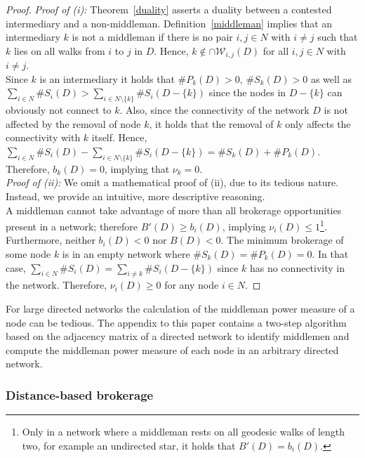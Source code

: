 \begin{proof}
\emph{Proof of (i):}
Theorem~\ref{duality} asserts a duality between a contested intermediary and a non-middleman. Definition~\ref{middleman} implies that an intermediary $k$ is not a middleman if there is no pair $i,j \in N$ with $i \neq j$ such that $k$ lies on all walks from $i$ to $j$ in $D$. Hence, $k \notin \cap \mathcal{W}_{i,j}(D)$ for all $i,j \in N$ with $i \neq j$.
\\
Since $k$ is an intermediary it holds that $\# P_{k}(D) > 0$, $\# S_{k}(D) > 0$ as well as $\sum_{i \in N} \# S_{i}(D) > \sum_{i \in N \setminus \{k\}} \# S_{i}(D - \{k\})$ since the nodes in $D - \{k\}$ can obviously not connect to $k$. Also, since the connectivity of the network $D$ is not affected by the removal of node $k$, it holds that the removal of $k$ only affects the connectivity with $k$ itself. Hence, $\sum_{i \in N} \# S_{i}(D) - \sum_{i \in N \setminus \{k\}} \# S_{i}(D - \{k\}) = \# S_{k}(D) + \# P_{k}(D)$. Therefore, $b_k (D) =0$, implying that $\nu_{k} = 0$.
\\[1.5ex]
\emph{Proof of (ii):}
We omit a mathematical proof of (ii), due to its tedious nature. Instead, we provide an intuitive, more descriptive reasoning. 
\\
A middleman cannot take advantage of more than all brokerage opportunities present in a network; therefore $B'(D) \geqslant b_{i}(D)$, implying $\nu_{i}(D) \leqslant 1$\footnote{Only in a network where a middleman rests on all geodesic walks of length two, for example an undirected star, it holds that $B'(D) = b_{i}(D)$.}.
\\
Furthermore, neither $b_{i}(D) < 0$ nor $B(D) < 0$. The minimum brokerage of some node $k$ is in an empty network where $\# S_{k}(D) = \# P_{k}(D) = 0$. In that case, $\sum_{i \in N} \# S_{i}(D) = \sum_{i \neq k} \# S_{i}(D - \{k\})$ since $k$ has no connectivity in the network. Therefore, $\nu_i (D) \geqslant 0$ for any node $i \in N$.
\end{proof}

\medskip\noindent For large directed networks the calculation of the middleman power measure of a node can be tedious. The appendix to this paper contains a two-step algorithm based on the adjacency matrix of a directed network to identify middlemen and compute the middleman power measure of each node in an arbitrary directed network.

\subsubsection*{Distance-based brokerage}

